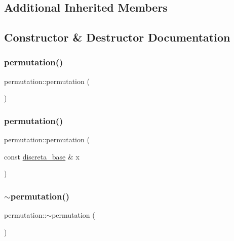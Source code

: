 \subsection*{Additional Inherited Members}


\subsection{Constructor \& Destructor Documentation}
\mbox{\label{classpermutation_acb97f9398a52237f9f36f0ad5c8bf104}} 
\subsubsection{\texorpdfstring{permutation()}{permutation()}\hspace{0.1cm}{\footnotesize\ttfamily [1/2]}}
{\footnotesize\ttfamily permutation\+::permutation (\begin{DoxyParamCaption}{ }\end{DoxyParamCaption})}

\mbox{\label{classpermutation_a501f039c465ea7d47e6e0c0a165caa15}} 
\subsubsection{\texorpdfstring{permutation()}{permutation()}\hspace{0.1cm}{\footnotesize\ttfamily [2/2]}}
{\footnotesize\ttfamily permutation\+::permutation (\begin{DoxyParamCaption}\item[{const \mbox{\hyperlink{classdiscreta__base}{discreta\+\_\+base}} \&}]{x }\end{DoxyParamCaption})}

\mbox{\label{classpermutation_a006ecef14989dcf8539388d019e965e2}} 
\subsubsection{\texorpdfstring{$\sim$permutation()}{~permutation()}}
{\footnotesize\ttfamily permutation\+::$\sim$permutation (\begin{DoxyParamCaption}{ }\end{DoxyParamCaption})}



